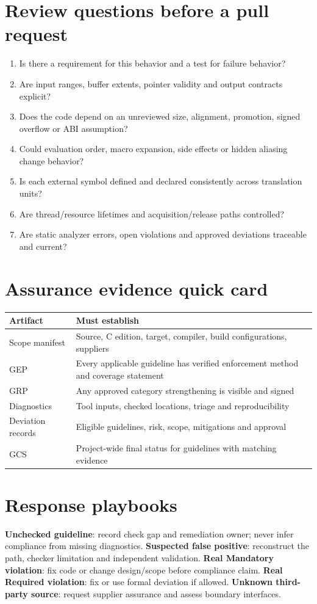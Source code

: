 \documentclass[10pt,letterpaper]{article}
\begin{document}
\section{Review questions before a pull request}
\begin{enumerate}
\item Is there a requirement for this behavior and a test for failure behavior?
\item Are input ranges, buffer extents, pointer validity and output contracts explicit?
\item Does the code depend on an unreviewed size, alignment, promotion, signed overflow or ABI assumption?
\item Could evaluation order, macro expansion, side effects or hidden aliasing change behavior?
\item Is each external symbol defined and declared consistently across translation units?
\item Are thread/resource lifetimes and acquisition/release paths controlled?
\item Are static analyzer errors, open violations and approved deviations traceable and current?
\end{enumerate}
\section{Assurance evidence quick card}
\begin{tabularx}{\linewidth}{@{}p{.26\linewidth}X@{}}\toprule
Artifact & Must establish\\\midrule
Scope manifest & Source, C edition, target, compiler, build configurations, suppliers\\
GEP & Every applicable guideline has verified enforcement method and coverage statement\\
GRP & Any approved category strengthening is visible and signed\\
Diagnostics & Tool inputs, checked locations, triage and reproducibility\\
Deviation records & Eligible guidelines, risk, scope, mitigations and approval\\
GCS & Project-wide final status for guidelines with matching evidence\\\bottomrule\end{tabularx}
\section{Response playbooks}
\textbf{Unchecked guideline}: record check gap and remediation owner; never infer compliance from missing diagnostics. \textbf{Suspected false positive}: reconstruct the path, checker limitation and independent validation. \textbf{Real Mandatory violation}: fix code or change design/scope before compliance claim. \textbf{Real Required violation}: fix or use formal deviation if allowed. \textbf{Unknown third-party source}: request supplier assurance and assess boundary interfaces.
\end{document}
